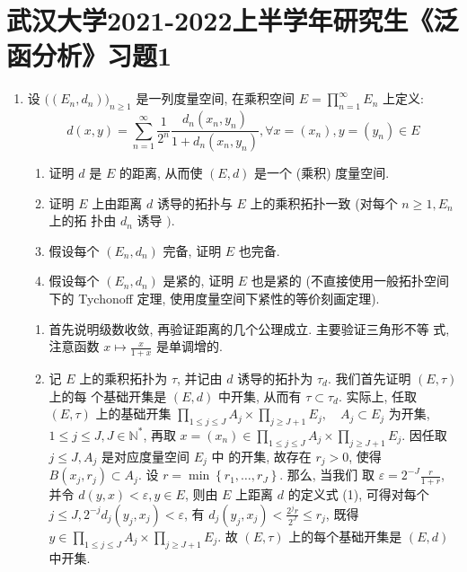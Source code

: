 


\section{武汉大学2021-2022上半学年研究生《泛函分析》习题1}
\begin{enumerate}
    \item 设 $\big((E_{n}, d_{n})\big)_{n \geq 1}$ 是一列度量空间, 在乘积空间 $E=\prod_{n=1}^{\infty} E_{n}$ 上定义:
    \[
    d(x, y)=\sum_{n=1}^{\infty} \frac{1}{2^{n}} \frac{d_{n}\left(x_{n}, y_{n}\right)}{1+d_{n}\left(x_{n}, y_{n}\right)}, \forall x=\left(x_{n}\right), y=\left(y_{n}\right) \in E
    \]
        \begin{enumerate}
            \item 证明 $d$ 是 $E$ 的距离, 从而使 $(E, d)$ 是一个 (乘积) 度量空间.
            \item 证明 $E$ 上由距离 $d$ 诱导的拓扑与 $E$ 上的乘积拓扑一致 (对每个 $n \geq 1, E_{n}$ 上的拓 扑由 $d_{n}$ 诱导 $)$.
            \item 假设每个 $\left(E_{n}, d_{n}\right)$ 完备, 证明 $E$ 也完备.
            \item 假设每个 $\left(E_{n}, d_{n}\right)$ 是紧的, 证明 $E$ 也是紧的 (不直接使用一般拓扑空间下的 Tychonoff 定理, 使用度量空间下紧性的等价刻画定理).
        \end{enumerate}
        \begin{answer}
            \begin{enumerate}
                \item 首先说明级数收敛, 再验证距离的几个公理成立. 主要验证三角形不等 式, 注意函数 $x \mapsto \frac{x}{1+x}$ 是单调增的.
                \item 记 $E$ 上的乘积拓扑为 $\tau$, 并记由 $d$ 诱导的拓扑为 $\tau_{d}$. 我们首先证明 $(E, \tau)$ 上的每 个基础开集是 $(E, d)$ 中开集, 从而有 $\tau \subset \tau_{d}$. 实际上, 任取 $(E, \tau)$ 上的基础开集
                $\prod_{1 \leq j \leq J} A_{j} \times \prod_{j \geq J+1} E_{j}, \quad A_{j} \subset E_{j}$ 为开集, $1 \leq j \leq J, J \in \mathbb{N}^{*}$,
                再取 $x=\left(x_{n}\right) \in \prod_{1 \leq j \leq J} A_{j} \times \prod_{j \geq J+1} E_{j}$. 因任取 $j \leq J, A_{j}$ 是对应度量空间 $E_{j}$ 中 的开集, 故存在 $r_{j}>0$, 使得 $B\left(x_{j}, r_{j}\right) \subset A_{j}$. 设 $r=\min \left\{r_{1}, \ldots, r_{J}\right\}$. 那么, 当我们 取 $\varepsilon=2^{-J} \frac{r}{1+r}$, 并令 $d(y, x)<\varepsilon, y \in E$, 则由 $E$ 上距离 $d$ 的定义式 (1), 可得对每个 $j \leq J, 2^{-j} d_{j}\left(y_{j}, x_{j}\right)<\varepsilon$, 有 $d_{j}\left(y_{j}, x_{j}\right)<\frac{2^{j} r}{2^{J}} \leq r_{j}$, 既得 $y \in \prod_{1 \leq j \leq J} A_{j} \times \prod_{j \geq J+1} E_{j}$. 故 $(E, \tau)$ 上的每个基础开集是 $(E, d)$ 中开集.

\end{enumerate}
\end{answer}
\end{enumerate}

